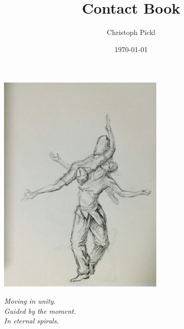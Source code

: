 \documentclass[a4paper]{article}
\title{Contact Book}
\date{\today}
\author{Christoph Pickl}
\begin{document}
\maketitle

\begin{center}
	\includegraphics[width=8cm]{images/cover.jpg}
	\vspace{0.5cm}
	
	\textit{Moving in unity.}\\
	\textit{Guided by the moment.}\\
	\textit{In eternal spirals.}
\end{center}
\newpage

\tableofcontents
\newpage







\end{document}
